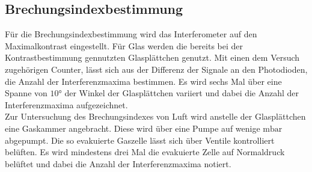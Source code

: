 \subsection{Brechungsindexbestimmung}
Für die Brechungsindexbestimmung wird das Interferometer auf den Maximalkontrast eingestellt. Für Glas werden die bereits bei der Kontrastbestimmung gennutzten Glasplättchen genutzt.
Mit einen dem Versuch zugehörigen Counter, lässt sich aus der Differenz der Signale an den Photodioden, die Anzahl der Interferenzmaxima bestimmen. Es wird sechs Mal über eine Spanne von $10°$ der Winkel der Glasplättchen
variiert und dabei die Anzahl der Interferenzmaxima aufgezeichnet.\\
Zur Untersuchung des Brechungsindexes von Luft wird anstelle der Glasplättchen eine Gaskammer angebracht. Diese wird über eine Pumpe auf wenige $\si{\milli\bar}$ abgepumpt. Die so evakuierte Gaszelle lässt sich
über Ventile kontrolliert belüften. Es wird mindestens drei Mal die evakuierte Zelle auf Normaldruck belüftet und dabei die Anzahl der Interferenzmaxima notiert.
